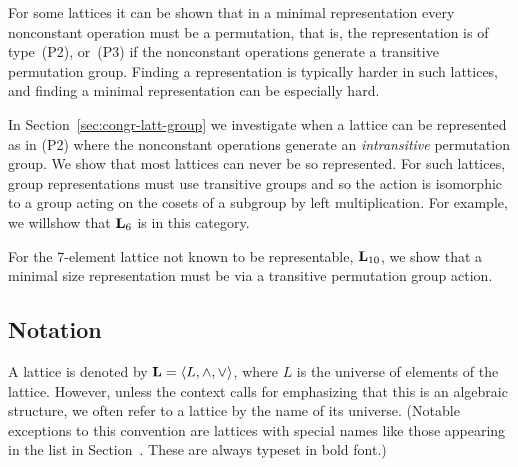
For some lattices it can be shown that in a minimal 
representation every nonconstant operation must be a 
permutation, that is, the representation is of type~(P2),
or~(P3) if the nonconstant operations generate a transitive permutation group.
Finding a representation is typically harder in such lattices,
and finding a minimal representation can be especially hard.

In Section~\ref{sec:congr-latt-group} we investigate when
a lattice can be represented as in (P2) where the 
nonconstant operations generate an \emph{intransitive}
permutation group.
We show that most lattices
can never be so represented. For such lattices, group 
representations must use transitive groups and so the
action is isomorphic to a group acting on the cosets
of a subgroup by left multiplication. For example,
we willshow that
$\mathbf{L}_6$ is in this category.


For the 7-element lattice not known to be representable, 
$\mathbf{L}_{10}$, we show that a minimal size representation 
must be via a transitive permutation group action.
 











\subsection{Notation}
A lattice is denoted by $\mathbf{L} = \langle L, \wedge, \vee\rangle$, where $L$
is the universe of elements of the lattice.  However, unless the context
calls for emphasizing that this is an algebraic structure, we often
refer to a lattice by the name of its universe. (Notable exceptions to
this convention are lattices with special names like those appearing in the list in
Section~\label{sec:small-unary-algebras}. These are always typeset in bold font.)

